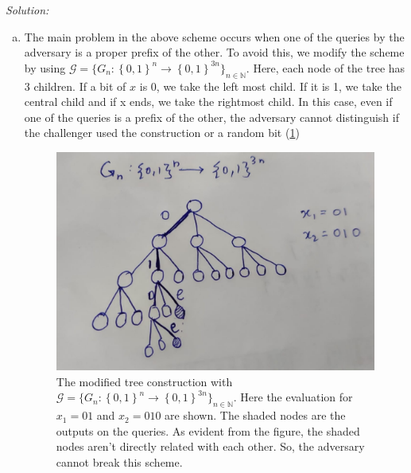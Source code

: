\documentclass[a4paper, 11pt]{article}
\newenvironment{solution}
    {\textit{Solution:}}
    {\clearpage}
\newcommand{\bit}{\left\{0, 1\right\}}
\newcommand{\N}{\mathbb{N}}
\newcommand{\calG}{\mathcal{G}}
\begin{document}
\begin{solution}
\begin{enumerate}[(a)]
        \item The main problem in the above scheme occurs when one of the queries by the adversary is a proper prefix of the other. To avoid this, we modify the scheme by using $\calG = \{G_n: \bit^n\rightarrow\bit^{3n}\}_{n\in\N}$. Here, each node of the tree has 3 children. If a bit of $x$ is 0, we take the left most child. If it is 1, we take the central child and if x ends, we take the rightmost child. In this case, even if one of the queries is a prefix of the other, the adversary cannot distinguish if the challenger used the construction or a random bit (\cref{fig:modtree})
        \begin{figure}[!ht]
            \centering
            \includegraphics[scale=0.25]{images/Modified tree.jpg}
            \caption{The modified tree construction with $\calG = \{G_n: \bit^n\rightarrow\bit^{3n}\}_{n\in\N}$. Here the evaluation for $x_1=01$ and $x_2=010$ are shown. The shaded nodes are the outputs on the queries. As evident from the figure, the shaded nodes aren't directly related with each other. So, the adversary cannot break this scheme.}
            \label{fig:modtree}
        \end{figure}
    \end{enumerate}
\end{solution}
\end{document}
